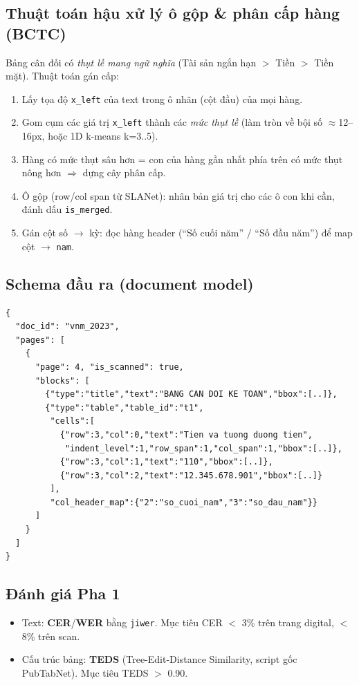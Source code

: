 \documentclass[11pt,a4paper]{article}
\begin{document}
\subsection{Thuật toán hậu xử lý ô gộp \& phân cấp hàng (BCTC)}
Bảng cân đối có \emph{thụt lề mang ngữ nghĩa} (Tài sản ngắn hạn $>$ Tiền $>$ Tiền mặt). Thuật toán gán cấp:
\begin{enumerate}
  \item Lấy tọa độ \texttt{x\_left} của text trong ô nhãn (cột đầu) của mọi hàng.
  \item Gom cụm các giá trị \texttt{x\_left} thành các \emph{mức thụt lề} (làm tròn về bội số $\approx$12--16px, hoặc 1D k-means k=3..5).
  \item Hàng có mức thụt sâu hơn = con của hàng gần nhất phía trên có mức thụt nông hơn $\Rightarrow$ dựng cây phân cấp.
  \item Ô gộp (row/col span từ SLANet): nhân bản giá trị cho các ô con khi cần, đánh dấu \texttt{is\_merged}.
  \item Gán cột số $\rightarrow$ kỳ: đọc hàng header (``Số cuối năm'' / ``Số đầu năm'') để map cột $\rightarrow$ \texttt{nam}.
\end{enumerate}

\subsection{Schema đầu ra (document model)}
\begin{Verbatim}
{
  "doc_id": "vnm_2023",
  "pages": [
    {
      "page": 4, "is_scanned": true,
      "blocks": [
        {"type":"title","text":"BANG CAN DOI KE TOAN","bbox":[..]},
        {"type":"table","table_id":"t1",
         "cells":[
           {"row":3,"col":0,"text":"Tien va tuong duong tien",
            "indent_level":1,"row_span":1,"col_span":1,"bbox":[..]},
           {"row":3,"col":1,"text":"110","bbox":[..]},
           {"row":3,"col":2,"text":"12.345.678.901","bbox":[..]}
         ],
         "col_header_map":{"2":"so_cuoi_nam","3":"so_dau_nam"}}
      ]
    }
  ]
}
\end{Verbatim}

\subsection{Đánh giá Pha 1}
\begin{itemize}
  \item Text: \textbf{CER}/\textbf{WER} bằng \texttt{jiwer}. Mục tiêu CER $<$ 3\% trên trang digital, $<$ 8\% trên scan.
  \item Cấu trúc bảng: \textbf{TEDS} (Tree-Edit-Distance Similarity, script gốc PubTabNet). Mục tiêu TEDS $>$ 0.90.
\end{itemize}
\end{document}
